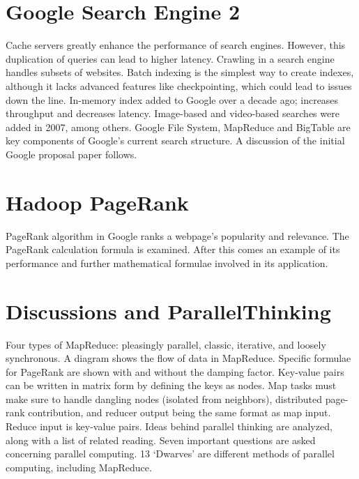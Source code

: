\section{Google Search Engine 2}

Cache servers greatly enhance the performance of search engines.
However, this duplication of queries can lead to higher latency.
Crawling in a search engine handles subsets of websites. Batch indexing
is the simplest way to create indexes, although it lacks advanced
features like checkpointing, which could lead to issues down the line.
In-memory index added to Google over a decade ago; increases throughput
and decreases latency. Image-based and video-based searches were added
in 2007, among others. Google File System, MapReduce and BigTable are
key components of Google's current search structure. A discussion of the
initial Google proposal paper follows.




\section{Hadoop PageRank}

PageRank algorithm in Google ranks a webpage's popularity and relevance.
The PageRank calculation formula is examined. After this comes an
example of its performance and further mathematical formulae involved in
its application.




\section{Discussions and ParallelThinking}

Four types of MapReduce: pleasingly parallel, classic, iterative, and
loosely synchronous. A diagram shows the flow of data in MapReduce.
Specific formulae for PageRank are shown with and without the damping
factor. Key-value pairs can be written in matrix form by defining the
keys as nodes. Map tasks must make sure to handle dangling nodes
(isolated from neighbors), distributed page-rank contribution, and
reducer output being the same format as map input. Reduce input is
key-value pairs. Ideas behind parallel thinking are analyzed, along with
a list of related reading. Seven important questions are asked
concerning parallel computing. 13 `Dwarves' are different methods of
parallel computing, including MapReduce.

